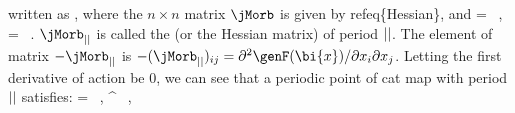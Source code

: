 written as ,
where the $n\!\times\!n$ matrix $\jMorb$ is given by
refeq\{Hessian\},
and
\bea
{}
=
\, ,
\quad
{}
=
\, .
\label{eq:VectorFieldSource}
\eea
$\jMorb_{\cl{}}$ is called the {\jacobianOrb} (or the Hessian matrix) of period ${||}$.
The element of matrix $-\jMorb_{\cl{}}$ is
$-(\jMorb_{\cl{}})_{ij} = \partial^2 \genF(\bi{x}) / \partial \ssp_i \partial \ssp_j$.
Letting the first derivative of action  be 0,
we can see that a periodic point of cat map with period ${||}$ satisfies:
\bea
{}
=
 \, ,
 \in \integers^\cl{} \, ,
\label{eq:LargrangianPerOrbits}
\eea

